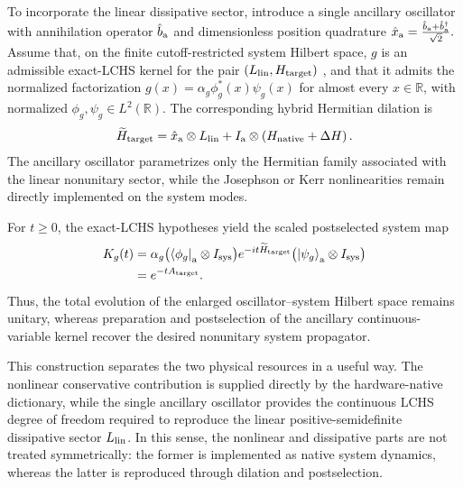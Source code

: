 \documentclass[pra,twocolumn,superscriptaddress,nofootinbib,floatfix]{revtex4-2}
\theoremstyle{remark}
\begin{document}
To incorporate the linear dissipative sector, introduce a single ancillary oscillator with annihilation operator \(\hat b_{\rm a}\) and dimensionless position quadrature
$\hat x_{\rm a}=\frac{\hat b_{\rm a}+\hat b_{\rm a}^{\dagger}}{\sqrt{2}}.$
Assume that, on the finite cutoff-restricted system Hilbert space, \(g\) is an admissible exact-LCHS kernel for the pair \(\left(L_{\rm lin},H_{\rm target}\right)\) \cite{An_2023,An_2026}, and that it admits the normalized factorization
\(g(x)=\alpha_g\phi_g^{*}(x)\psi_g(x)\)
for almost every \(x\in\mathbb R\), with normalized \(\phi_g,\psi_g\in L^2(\mathbb R).\)
The corresponding hybrid Hermitian dilation is
\begin{align}
\widetilde H_{\rm target}=\hat x_{\rm a}\otimes L_{\rm lin}+I_{\rm a}\otimes\left(H_{\rm native}+\Delta H\right).
\label{eq:hybrid-target-hamiltonian}
\end{align}
The ancillary oscillator parametrizes only the Hermitian family associated with the linear nonunitary sector, while the Josephson or Kerr nonlinearities remain directly implemented on the system modes.

For \(t\geq0\), the exact-LCHS hypotheses yield the scaled postselected system map~\cite[Theorem~1]{das2026quantumdifferentialequationsolver}
\begin{align}
K_g(t)&=\alpha_g\bigl(\bra{\phi_g}_{\rm a}\otimes I_{\rm sys}\bigr)e^{-it\widetilde H_{\rm target}}\bigl(\ket{\psi_g}_{\rm a}\otimes I_{\rm sys}\bigr)\nonumber\\
&=e^{-tA_{\rm target}}.
\label{eq:exact-one-mode-dilation}
\end{align}
Thus, the total evolution of the enlarged oscillator--system Hilbert space remains unitary, whereas preparation and postselection of the ancillary continuous-variable kernel recover the desired nonunitary system propagator.

This construction separates the two physical resources in a useful way. The nonlinear conservative contribution is supplied directly by the hardware-native dictionary, while the single ancillary oscillator provides the continuous LCHS degree of freedom required to reproduce the linear positive-semidefinite dissipative sector \(L_{\rm lin}\). In this sense, the nonlinear and dissipative parts are not treated symmetrically: the former is implemented as native system dynamics, whereas the latter is reproduced through dilation and postselection.
\end{document}
